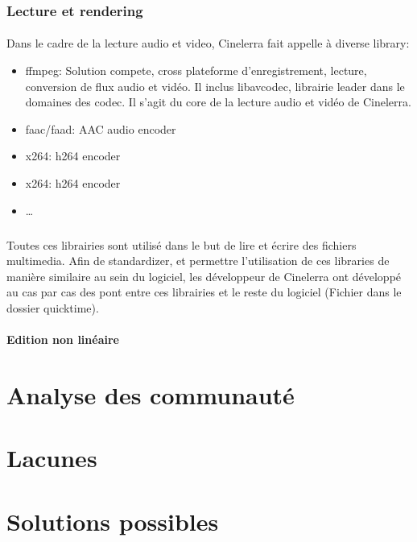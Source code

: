 \subsubsection{Lecture et rendering}

\paragraph{}

Dans le cadre de la lecture audio et video, Cinelerra fait appelle à diverse library:

\begin{itemize}

  \item{ffmpeg: Solution compete, cross plateforme d'enregistrement, lecture, conversion
    de flux audio et vidéo. Il inclus libavcodec, librairie leader dans le domaines des codec.
    Il s'agit du core de la lecture audio et vidéo de Cinelerra.}

  \item{faac/faad: AAC audio encoder}

  \item{x264: h264 encoder}

  \item{x264: h264 encoder}

  \item{\ldots}

\end{itemize}

\subparagraph{}

Toutes ces librairies sont utilisé dans le but de lire et écrire des fichiers multimedia.
Afin de standardizer, et permettre l'utilisation de ces libraries de manière similaire
au sein du logiciel, les développeur de Cinelerra ont développé au cas par cas des pont entre
ces librairies et le reste du logiciel (Fichier dans le dossier quicktime).

\paragraph{Edition non linéaire}


\newpage \section{Analyse des communauté}

\newpage \section{Lacunes}

\newpage \section{Solutions possibles}
